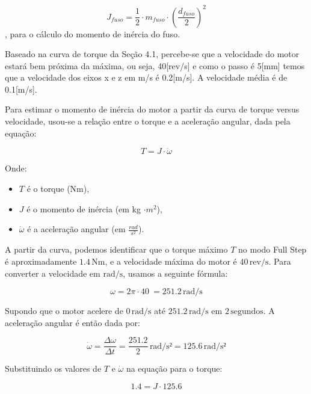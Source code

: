 \begin{equation}
    J_{fuso} = \frac{1}{2} \cdot m_{fuso} \cdot (\frac{d_{fuso}}{2})^2
\end{equation}, para o cálculo do momento de inércia do fuso. 

Baseado na curva de torque da Seção 4.1, percebe-se que a velocidade do motor estará bem próxima da máxima, ou seja, 40[rev/s] e como o passo é 5[mm] temos que a velocidade dos eixos x e z em m/s é 0.2[m/s]. A velocidade média é de 0.1[m/s].  

Para estimar o momento de inércia do motor a partir da curva de torque versus velocidade, usou-se a relação entre o torque e a aceleração angular, dada pela equação:

\begin{equation}
    T = J \cdot \dot{\omega}
\end{equation}

Onde:
\begin{itemize}
    \item \( T \) é o torque (Nm),
    \item \( J \) é o momento de inércia (em kg $\cdot m^2$),
    \item \( \dot{\omega} \) é a aceleração angular (em $\frac{rad}{s^2}$).
\end{itemize}

A partir da curva, podemos identificar que o torque máximo \( T \) no modo Full Step é aproximadamente \( 1.4 \, \text{Nm} \), e a velocidade máxima do motor é \( 40 \, \text{rev/s} \). Para converter a velocidade em \( \text{rad/s} \), usamos a seguinte fórmula:

\begin{equation}
    \omega = 2\pi \cdot 40 \ = 251.2 \, \text{rad/s}
\end{equation}

Supondo que o motor acelere de \( 0 \, \text{rad/s} \) até \( 251.2 \, \text{rad/s} \) em \( 2 \, \text{segundos} \). A aceleração angular é então dada por:

\begin{equation}
    \dot{\omega} = \frac{\Delta \omega}{\Delta t} = \frac{251.2}{2} \, \text{rad/s²} = 125.6 \, \text{rad/s²}
\end{equation}

Substituindo os valores de \( T \) e \( \dot{\omega} \) na equação para o torque:

\begin{equation}
    1.4 = J \cdot 125.6
\end{equation}

